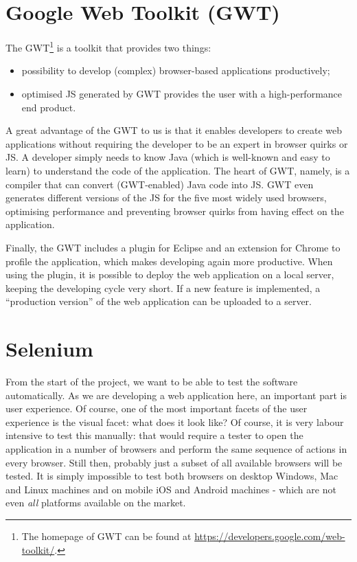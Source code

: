 \section{Google Web Toolkit (GWT)}
The GWT\footnote{The homepage of GWT can be found at \url{https://developers.google.com/web-toolkit/}.} is a toolkit that provides two things:
\begin{itemize}
	\item possibility to develop (complex) browser-based applications productively;
	\item optimised JS generated by GWT provides the user with a high-performance end product.
\end{itemize}
A great advantage of the GWT to us is that it enables developers to create web applications without requiring the developer to be an expert in browser quirks or JS. A developer simply needs to know Java (which is well-known and easy to learn) to understand the code of the application. The heart of GWT, namely, is a compiler that can convert (GWT-enabled) Java code into JS. GWT even generates different versions of the JS for the five most widely used browsers, optimising performance and preventing browser quirks from having effect on the application.

Finally, the GWT includes a plugin for Eclipse and an extension for Chrome to profile the application, which makes developing again more productive. When using the plugin, it is possible to deploy the web application on a local server, keeping the developing cycle very short. If a new feature is implemented, a ``production version'' of the web application can be uploaded to a server.

\section{Selenium}
From the start of the project, we want to be able to test the software automatically. As we are developing a web application here, an important part is user experience. Of course, one of the most important facets of the user experience is the visual facet: what does it look like? Of course, it is very labour intensive to test this manually: that would require a tester to open the application in a number of browsers and perform the same sequence of actions in every browser. Still then, probably just a subset of all available browsers will be tested. It is simply impossible to test both browsers on desktop Windows, Mac and Linux machines and on mobile iOS and Android machines - which are not even \emph{all} platforms available on the market.

